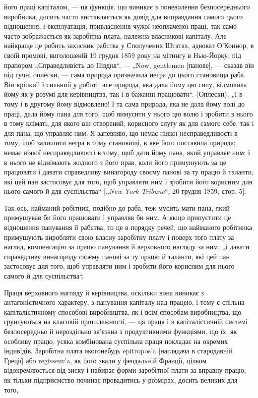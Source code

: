 \parcont{}  %
його праці капіталом, — ця функція, що виникає з поневолення
безпосереднього виробника, досить часто виставляється як довід
для виправдання самого цього відношення, і експлуатація, привласнення
чужої неоплаченої праці, так само часто зображається
як заробітна плата, належна власникові капіталу. Але найкраще
це робить захисник рабства у Сполучених Штатах, адвокат
О’Коннор, в своїй промові, виголошеній 19 грудня 1859 року
на мітингу в Нью-Йорку, під прапором „Справедливість до
Півдня“. — „Now, gentlemen [панове], — сказав він під гучні
оплески, — сама природа призначила негра до цього становища
раба. Він кріпкий і сильний у роботі; але природа, яка дала
йому цю силу, відмовила йому як у розумі для керівництва, так
і в бажанні працювати“. (Оплески). „І в тому і в другому йому
відмовлено! І та сама природа, яка не дала йому волі до праці,
дала йому пана для того, щоб вимусити у нього цю волю і
зробити з нього в тому кліматі, для якого він створений, корисного
слугу як для самого себе, так і для пана, що управляє
ним. Я запевняю, що немає ніякої несправедливості в тому, щоб
залишити негра в тому становищі, в яке його поставила природа;
немає ніякої несправедливості в тому, щоб дати йому пана, який
управляє ним; і в нього не віднімають жодного з його прав, коли
його примушують за це працювати і давати справедливу винагороду
своєму панові за ту працю й таланти, які цей пан застосовує
для того, щоб управляти ним і зробити його корисним
для нього самого й для суспільства“ [„\emph{New York Tribune}“,
20 грудня 1859, стор. 5].

Так ось, найманий робітник, подібно до раба, теж мусить
мати пана, який примушував би його працювати і управляв би
ним. А якщо припустити це відношення панування й рабства,
то це в порядку речей, що найманого робітника примушують
виробляти свою власну заробітну плату і поверх того плату
за нагляд, компенсацію за працю панування й верховного нагляду
за ним, „і давати справедливу винагороду своєму панові
за ту працю й таланти, які цей пан застосовує для того, щоб
управляти ним і зробити його корисним для нього самого й для
суспільства“.

Праця верховного нагляду й керівництва, оскільки вона виникає
з антагоністичного характеру, з панування капіталу над працею,
і тому є спільна капіталістичному способові виробництва,
як і всім способам виробництва, що грунтуються на класовій
протилежності, — ця праця і в капіталістичній системі безпосередньо
й нероздільно зв’язана з продуктивними функціями, що
їх, як особливу працю, усяка комбінована суспільна праця покладає
на окремих індивідів. Заробітна плата якогонебудь epitropos’a
[наглядача в стародавній Греції] або regisseur’a, як його звали
у феодальній Франції, цілком відокремлюється від зиску і набирає
форми заробітної плати за вправну працю, як тільки підприємство
починає провадитись у розмірах, досить великих для того,
\parbreak{}  %
